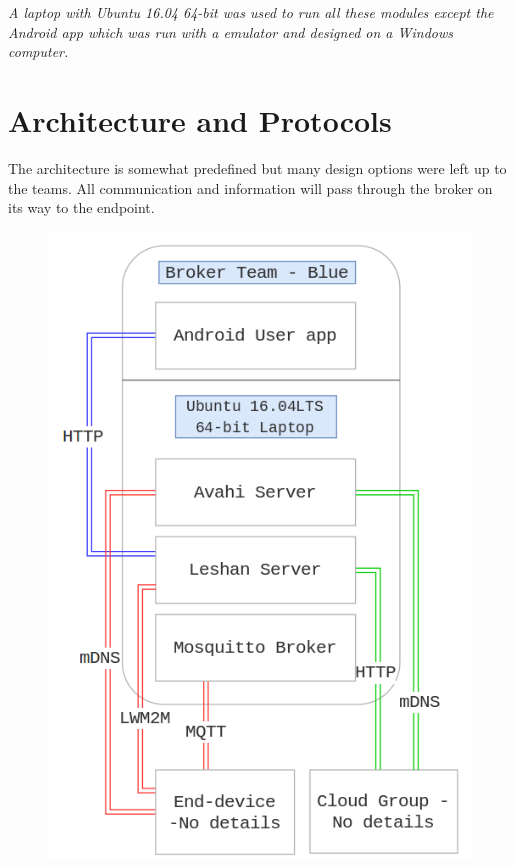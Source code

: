 \documentclass[conference]{IEEEtran}
\begin{document}
\textit{A laptop with Ubuntu 16.04 64-bit was used to run all these modules except the Android app which was run with a emulator and designed on a Windows computer.}




\section{Architecture and Protocols}

The architecture is somewhat predefined but many design options were left up to the teams. All communication and information will pass through the broker on its way to the endpoint. 

\begin{figure}[h]
	\begin{center}
		\includegraphics[width=1\linewidth]{img/overview}
		\caption{}
		\label{fig:fig2}
	\end{center}
\end{figure}
\end{document}

